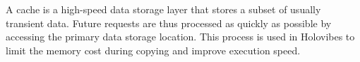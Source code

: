 A cache is a high-speed data storage layer that stores a  subset of usually transient data. Future requests are thus processed as quickly as possible by accessing the primary data storage location. This process is used in Holovibes to limit the memory cost during copying and improve execution speed.